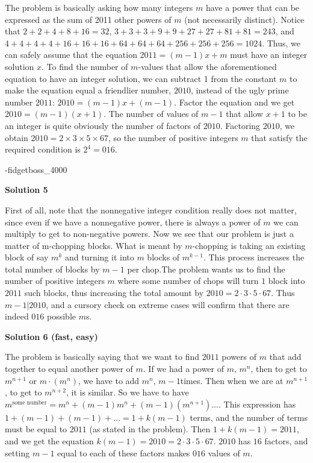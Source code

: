 \begin{enumerate}
The problem is basically asking how many integers $m$ have a power that can be expressed as the sum of 2011 other powers of $m$ (not necessarily distinct). Notice that $2+2+4+8+16=32$, $3+3+3+9+9+27+27+81+81=243$, and $4+4+4+4+16+16+16+64+64+64+256+256+256=1024$. Thus, we can safely assume that the equation $2011 = (m-1)x + m$ must have an integer solution $x$. To find the number of $m$-values that allow the aforementioned equation to have an integer solution, we can subtract 1 from the constant $m$ to make the equation equal a friendlier number, $2010$, instead of the ugly prime number $2011$: $2010 = (m-1)x+(m-1)$. Factor the equation and we get $2010 = (m-1)(x+1)$. The number of values of $m-1$ that allow $x+1$ to be an integer is quite obviously the number of factors of $2010$. Factoring $2010$, we obtain $2010 = 2 \times 3 \times 5 \times 67$, so the number of positive integers $m$ that satisfy the required condition is $2^4 = \boxed{016}$.

 -fidgetboss\_4000

 



\textbf{Solution 5}

First of all, note that the nonnegative integer condition really does not matter, since even if we have a nonnegative power, there is always a power of $m$ we can multiply to get to non-negative powers. Now we see that our problem is just a matter of m-chopping blocks. What is meant by $m$-chopping is taking an existing block of say $m^{k}$ and turning it into $m$ blocks of $m^{k-1}$. This process increases the total number of blocks by $m-1$ per chop.The problem wants us to find the number of positive integers $m$ where some number of chops will turn $1$ block into $2011$ such blocks, thus increasing the total amount by $2010= 2 \cdot 3 \cdot 5 \cdot 67$. Thus $m-1 | 2010$, and a cursory check on extreme cases will confirm that there are indeed $\boxed{016}$ possible $m$s.

 



\textbf{Solution 6 (fast, easy)}

The problem is basically saying that we want to find $2011$ powers of $m$ that add together to equal another power of $m$. If we had a power of $m$, $m^n$, then to get to $m^{n+1}$ or $m \cdot (m^n)$, we have to add $m^n$, $m-1$times. Then when we are at $m^{n+1}$, to get to $m^{n+2}$, it is similar. So we have to have $m^{\text{some number}} = m^n + (m-1){m^n} + (m-1)(m^{n+1})\dots$. This expression has $1 + (m-1) + (m-1) + \dots = 1 + k(m-1)$ terms, and the number of terms must be equal to $2011$ (as stated in the problem). Then $1+k(m-1) = 2011$, and we get the equation $k(m-1) = 2010 = 2\cdot3\cdot5\cdot67$. $2010$ has $16$ factors, and setting $m-1$ equal to each of these factors makes $\boxed{016}$ values of $m$.


\end{enumerate}
